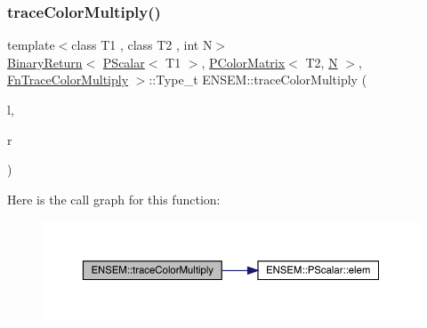 \subsubsection{\texorpdfstring{traceColorMultiply()}{traceColorMultiply()}\hspace{0.1cm}{\footnotesize\ttfamily [3/3]}}
{\footnotesize\ttfamily template$<$class T1 , class T2 , int N$>$ \\
\mbox{\hyperlink{structENSEM_1_1BinaryReturn}{Binary\+Return}}$<$ \mbox{\hyperlink{classENSEM_1_1PScalar}{P\+Scalar}}$<$ T1 $>$, \mbox{\hyperlink{classENSEM_1_1PColorMatrix}{P\+Color\+Matrix}}$<$ T2, \mbox{\hyperlink{adat__devel_2lib_2hadron_2operator__name__util_8cc_a7722c8ecbb62d99aee7ce68b1752f337}{N}} $>$, \mbox{\hyperlink{structENSEM_1_1FnTraceColorMultiply}{Fn\+Trace\+Color\+Multiply}} $>$\+::Type\+\_\+t E\+N\+S\+E\+M\+::trace\+Color\+Multiply (\begin{DoxyParamCaption}\item[{const \mbox{\hyperlink{classENSEM_1_1PScalar}{P\+Scalar}}$<$ T1 $>$ \&}]{l,  }\item[{const \mbox{\hyperlink{classENSEM_1_1PColorMatrix}{P\+Color\+Matrix}}$<$ T2, \mbox{\hyperlink{adat__devel_2lib_2hadron_2operator__name__util_8cc_a7722c8ecbb62d99aee7ce68b1752f337}{N}} $>$ \&}]{r }\end{DoxyParamCaption})\hspace{0.3cm}{\ttfamily [inline]}}

Here is the call graph for this function\+:\nopagebreak
\begin{figure}[H]
\begin{center}
\leavevmode
\includegraphics[width=350pt]{dd/d2f/group__primcolormatrix_ga0e0db533c0e6dc778fc9f271537b96eb_cgraph}
\end{center}
\end{figure}
\mbox{\label{group__primcolormatrix_gad27a30bd1b98827095b42464443c9ffc}} 
